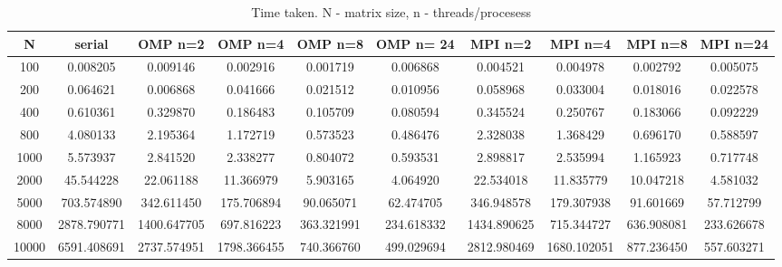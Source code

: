\documentclass{article}
\begin{document}
\begin{table}[h]
	\caption{Time taken. N - matrix size, n - threads/procesess}
	\centering
	\begin{tabular}{| S[round-precision=3] | S[round-precision=3] | S[round-precision=3] | S[round-precision=3] | S[round-precision=3] | S[round-precision=3] | S[round-precision=3] | S[round-precision=3] | S[round-precision=3] | S[round-precision=3] |}
			\hline
			{N}&{serial} & {OMP n=2}& {OMP n=4}& {OMP n=8}& {OMP n= 24} & {MPI n=2}& {MPI n=4}& {MPI n=8}& {MPI n=24} \\ \hline
			{100}&0.008205&0.009146&0.002916&0.001719
			&0.006868 & 0.004521 & 0.004978 &0.002792&0.005075\\ \hline

			{200}&0.064621&0.006868&0.041666&	0.021512&0.010956
			&0.058968&0.033004&0.018016&0.022578\\ \hline

			{400} &0.610361&0.329870&0.186483&0.105709&0.080594 
			&0.345524&0.250767&0.183066&0.092229\\ \hline

			{800}&4.080133&2.195364&1.172719&0.573523&0.486476
			&2.328038&1.368429&0.696170&0.588597\\ \hline

			{1000}&5.573937&2.841520&2.338277&0.804072&0.593531
			&2.898817&2.535994&1.165923&0.717748\\ \hline

			{2000}&45.544228&22.061188&11.366979&5.903165&4.064920
			&22.534018&11.835779&10.047218&4.581032\\ \hline

			{5000}&703.574890&342.611450&175.706894&90.065071&62.474705
			&346.948578&179.307938&91.601669&57.712799\\ \hline

			{8000}&2878.790771&1400.647705&697.816223&363.321991 
			&234.618332&1434.890625&715.344727&636.908081
			&233.626678 \\ \hline

			{10000}&6591.408691&2737.574951&1798.366455&740.366760 
			&499.029694&2812.980469&1680.102051&877.236450&557.603271\\ 
			\hline
		\end{tabular}


\end{table}
\end{document}
